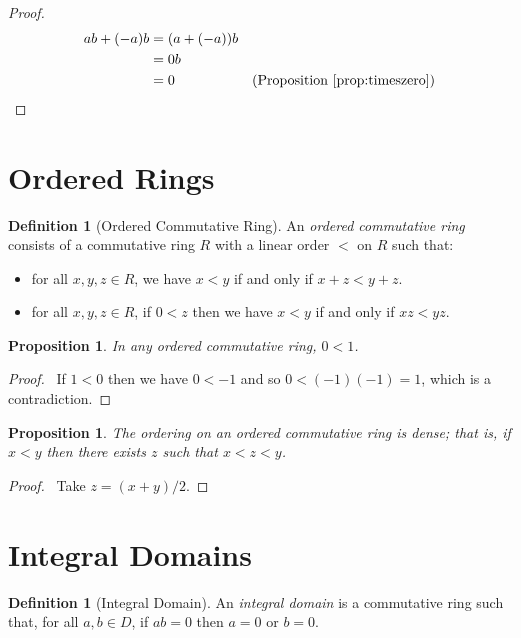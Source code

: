 \documentclass{book}
\let\qed\relax
\newtheorem{prop}[ax]{Proposition}
\theoremstyle{definition}
\newtheorem{df}[ax]{Definition}
\begin{document}
\begin{proof}
\pf
\begin{align*}
ab + (-a)b & = (a + (-a))b \\
& = 0b \\
& = 0 & (\text{Proposition \ref{prop:timeszero}}) \qed
\end{align*}
\end{proof}

\section{Ordered Rings}

\begin{df}[Ordered Commutative Ring]
An \emph{ordered commutative ring} consists of a commutative ring $R$ with a linear order $<$ on $R$ such that:
\begin{itemize}
\item for all $x,y,z \in R$, we have $x < y$ if and only if $x + z < y + z$.
\item for all $x,y,z \in R$, if $0 < z$ then we have $x < y$ if and only if $xz < yz$.
\end{itemize}
\end{df}

\begin{prop}
In any ordered commutative ring, $0 < 1$.
\end{prop}

\begin{proof}
\pf\ If $1 < 0$ then we have $0 < -1$ and so $0 < (-1)(-1) = 1$, which is a contradiction. \qed
\end{proof}

\begin{prop}
The ordering on an ordered commutative ring is dense; that is, if $x < y$ then there exists $z$ such that $x < z < y$.
\end{prop}

\begin{proof}
\pf\ Take $z = (x + y) / 2$. \qed
\end{proof}

\section{Integral Domains}

\begin{df}[Integral Domain]
An \emph{integral domain} is a commutative ring such that, for all $a,b \in D$, if $ab = 0$ then $a = 0$ or $b = 0$.
\end{df}
\end{document}
